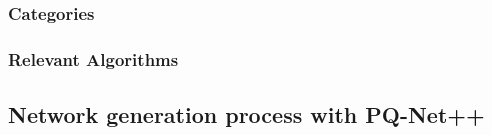 \subsubsection{Categories}
\subsubsection{Relevant Algorithms}
\subsection{Network generation process with PQ-Net++}

